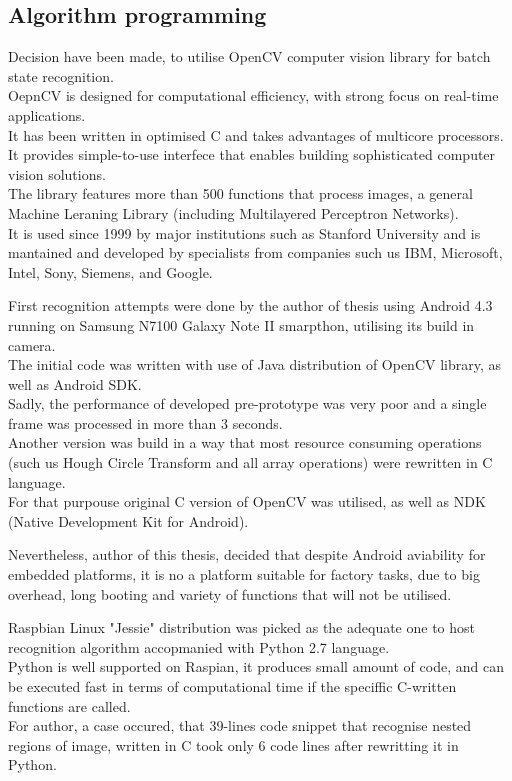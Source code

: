 \documentclass[12pt,twoside,a4paper]{article}
\begin{document}
\subsection{Algorithm programming}
Decision have been made, to utilise OpenCV computer vision library for batch state recognition.\\
OepnCV is designed for computational efficiency, with strong focus on real-time applications.\\
It has been written in optimised C and takes advantages of multicore processors.\\
It provides simple-to-use interfece that enables building sophisticated computer vision solutions.\\
The library features more than 500 functions that process images, a general Machine Leraning Library (including Multilayered Perceptron Networks).\\
It is used since 1999 by major institutions such as Stanford University and is mantained and developed by specialists from companies such us IBM, Microsoft, Intel, Sony, Siemens, and Google.\cite{learnopencv}

First recognition attempts were done by the author of thesis using Android 4.3 running on Samsung N7100 Galaxy Note II smarpthon, utilising its build in camera.\\
The initial code was written with use of Java distribution of OpenCV library, as well as Android SDK.\\
Sadly, the performance of developed pre-prototype was very poor and a single frame was processed in more than 3 seconds.\\
Another version was build in a way that most resource consuming operations (such us Hough Circle Transform and all array operations) were rewritten in C language.\\
For that purpouse original C version of OpenCV was utilised, as well as NDK (Native Development Kit for Android).

Nevertheless, author of this thesis, decided that despite Android aviability for embedded platforms, it is no a platform suitable for factory tasks, due to big overhead, long booting and variety of functions that will not be utilised.

Raspbian Linux "Jessie" distribution was picked as the adequate one to host recognition algorithm accopmanied with Python 2.7 language.\\
Python is well supported on Raspian, it produces small amount of code, and can be executed fast in terms of computational time if the speciffic C-written functions are called.\cite{performance}\\
For author, a case occured, that 39-lines code snippet that recognise nested regions of image, written in C took only 6 code lines after rewritting it in Python.
\end{document}
